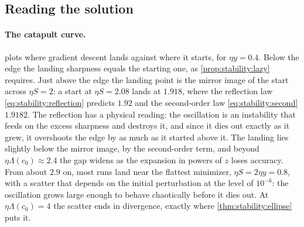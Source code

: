 \begin{refsection}

\section{Reading the solution}\label{sec:stability:reading}

\paragraph{The catapult curve.}  plots where gradient descent lands against where it starts, for $\eta y=0.4$. Below the edge the landing sharpness equals the starting one, as \cref{prop:stability:lazy} requires. Just above the edge the landing point is the mirror image of the start across $\eta S=2$: a start at $\eta S=2.08$ lands at $1.918$, where the reflection law \eqref{eq:stability:reflection} predicts $1.92$ and the second-order law \eqref{eq:stability:second} $1.9182$. The reflection has a physical reading: the oscillation is an instability that feeds on the excess sharpness and destroys it, and since it dies out exactly as it grew, it overshoots the edge by as much as it started above it. The landing lies slightly below the mirror image, by the second-order term, and beyond $\eta\Lambda(c_0)\approx2.4$ the gap widens as the expansion in powers of $z$ loses accuracy. From about $2.9$ on, most runs land near the flattest minimizer, $\eta S=2\eta y=0.8$, with a scatter that depends on the initial perturbation at the level of $10^{-6}$: the oscillation grows large enough to behave chaotically before it dies out. At $\eta\Lambda(c_0)=4$ the scatter ends in divergence, exactly where \cref{thm:stability:ellipse} puts it.


\end{refsection}
